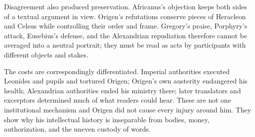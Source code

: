 Disagreement also produced preservation. Africanus's objection keeps both
sides of a textual argument in view. Origen's refutations conserve pieces of
Heracleon and Celsus while controlling their order and frame. Gregory's praise,
Porphyry's attack, Eusebius's defense, and the Alexandrian repudiation therefore
cannot be averaged into a neutral portrait; they must be read as acts by
participants with different objects and stakes.

The costs are correspondingly differentiated. Imperial authorities executed
Leonides and pupils and tortured Origen; Origen's own austerity endangered his
health; Alexandrian authorities ended his ministry there; later translators
and excerptors determined much of what readers could hear. These are not one
institutional mechanism and Origen did not cause every injury around him. They
show why his intellectual history is inseparable from bodies, money,
authorization, and the uneven custody of words.
